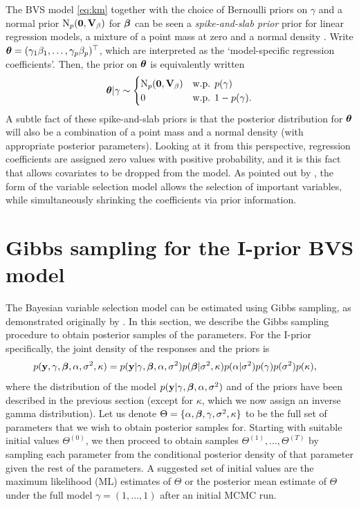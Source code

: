\documentclass[showframe,11pt,twoside,openright]{report}
\begin{document}
\begin{remark}
  The BVS model \cref{eq:km} together with the choice of Bernoulli priors on $\gamma$ and a normal prior $\operatorname{N}_p({\mathbf 0},{\mathbf V}_\beta)$ for ${\bm\beta}$ can be seen a \emph{spike-and-slab prior} prior for linear regression models, a mixture of a point mass at zero and a normal density \citep{mitchell1988bayesian,geweke1996variable}.
  Write ${\bm\theta} = (\gamma_1\beta_1,\dots,\gamma_p\beta_p)^\top$, which are interpreted as the `model-specific regression coefficients'.
  Then, the prior on ${\bm\theta}$ is equivalently written
  \[
    {\bm\theta}|\gamma \sim
    \begin{cases}
      \operatorname{N}_p({\mathbf 0},{\mathbf V}_\beta) & \text{w.p. } p(\gamma) \\
      0 & \text{w.p. } 1 - p(\gamma).
    \end{cases}
  \]
  A subtle fact of these spike-and-slab priors is that the posterior distribution for ${\bm\theta}$ will also be a combination of a point mass and a normal density (with appropriate posterior parameters).
  Looking at it from this perspective, regression coefficients are assigned zero values with positive probability, and it is this fact that allows covariates to be dropped from the model.
  As pointed out by \citet{Kuo1998}, the form of the variable selection model allows the selection of important variables, while simultaneously shrinking the coefficients via prior information.
\end{remark}

\section{Gibbs sampling for the I-prior BVS model}

The Bayesian variable selection model can be estimated using Gibbs sampling, as demonstrated originally by \citet{Kuo1998}.
In this section, we describe the Gibbs sampling procedure to obtain posterior samples of the parameters.
For the I-prior specifically, the joint density of the responses and the priors is 
\begin{align*}
  p({\mathbf y},\gamma,{\bm\beta},\alpha,\sigma^2,\kappa)
  &= p({\mathbf y}|\gamma,{\bm\beta},\alpha,\sigma^2)p({\bm\beta}|\sigma^2,\kappa)p(\alpha|\sigma^2)p(\gamma)p(\sigma^2)p(\kappa),
\end{align*}
where the distribution of the model $p({\mathbf y}|\gamma,{\bm\beta},\alpha,\sigma^2)$ and of the priors have been described in the previous section (except for $\kappa$, which we now assign an inverse gamma distribution).
Let us denote $\Theta=\{\alpha,{\bm\beta},\gamma,\sigma^2,\kappa\}$ to be the full set of parameters that we wish to obtain posterior samples for.
Starting with suitable initial values $\Theta^{(0)}$, we then proceed to obtain samples $\Theta^{(1)}, \dots, \Theta^{(T)}$ by sampling each parameter from the conditional posterior density of that parameter given the rest of the parameters.
A suggested set of initial values are the maximum likelihood (ML) estimates of $\Theta$ or the posterior mean estimate of $\Theta$ under the full model $\gamma=(1,\dots,1)$ after an initial MCMC run.
\end{document}
